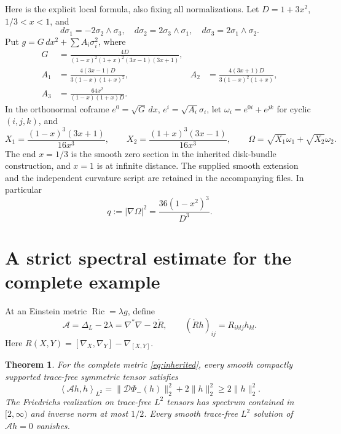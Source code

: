 \documentclass[11pt]{article}
\newtheorem{theorem}{Theorem}[section]
\DeclareMathOperator{\Ric}{Ric}
\newcommand{\ip}[2]{\left\langle #1,#2\right\rangle}
\begin{document}
Here is the explicit local formula, also fixing all normalizations. Let
$D=1+3x^2$, $1/3<x<1$, and
\[
 d\sigma_1=-2\sigma_2\wedge\sigma_3,\quad
 d\sigma_2=2\sigma_3\wedge\sigma_1,\quad
 d\sigma_3=2\sigma_1\wedge\sigma_2.
\]
Put $g=G\,dx^2+\sum A_i\sigma_i^2$, where
\begin{align*}
 G&=\frac{4D}{(1-x)^2(1+x)^2(3x-1)(3x+1)},\\
 A_1&=\frac{4(3x-1)D}{3(1-x)(1+x)^2},&
 A_2&=\frac{4(3x+1)D}{3(1-x)^2(1+x)},\\
 A_3&=\frac{64x^2}{(1-x)(1+x)D}.
\end{align*}
In the orthonormal coframe $e^0=\sqrt G\,dx$, $e^i=\sqrt{A_i}\sigma_i$, let $\omega_i=e^{0i}+e^{jk}$ for cyclic $(i,j,k)$, and
\[
 X_1=\frac{(1-x)^3(3x+1)}{16x^3},\qquad
 X_2=\frac{(1+x)^3(3x-1)}{16x^3},\qquad
 \Omega=\sqrt{X_1}\omega_1+\sqrt{X_2}\omega_2.
\]
The end $x=1/3$ is the smooth zero section in the inherited disk-bundle construction, and $x=1$ is at infinite distance. The supplied smooth extension and the independent curvature script are retained in the accompanying files. In particular
\begin{equation}\label{eq:q}
 q:=|\nabla\Omega|^2=\frac{36(1-x^2)^3}{D^3}.
\end{equation}

\section{A strict spectral estimate for the complete example}
At an Einstein metric $\Ric=\lambda g$, define
\[
 \mathcal A=\Delta_L-2\lambda=\nabla^*\nabla-2\mathring R,
 \qquad (\mathring Rh)_{ij}=R_{iklj}h_{kl}.
\]
Here $R(X,Y)=[\nabla_X,\nabla_Y]-\nabla_{[X,Y]}$.

\begin{theorem}\label{thm:stability}
For the complete metric \eqref{eq:inherited}, every smooth compactly supported trace-free symmetric tensor satisfies
\begin{equation}\label{eq:factor}
 \ip{\mathcal Ah}{h}_{L^2}
 =\|\mathcal D\Phi_-(h)\|_2^2+2\|h\|_2^2
 \ge2\|h\|_2^2.
\end{equation}
The Friedrichs realization on trace-free $L^2$ tensors has spectrum contained in $[2,\infty)$ and inverse norm at most $1/2$. Every smooth trace-free $L^2$ solution of $\mathcal Ah=0$ vanishes.
\end{theorem}
\end{document}
